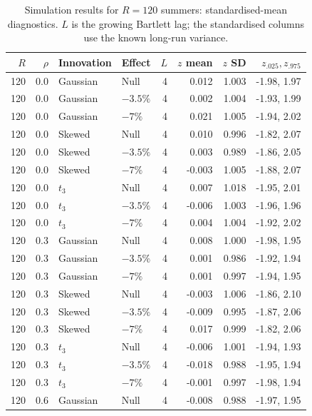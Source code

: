 \begin{table}[H]
\centering
\normalsize\renewcommand{\arraystretch}{1.55}\setlength{\tabcolsep}{4pt}
\caption{Simulation results for $R=120$ summers: standardised-mean diagnostics. $L$ is the growing Bartlett lag; the standardised columns use the known long-run variance.}
\label{tab:year-simulation-complete-b-r120}
\begin{tabular*}{\textwidth}{@{\extracolsep{\fill}}rrllrrrr}
\toprule
$R$ & $\rho$ & Innovation & Effect & $L$ & $z$ mean & $z$ SD & $z_{.025},z_{.975}$ \\
\midrule
120 & 0.0 & Gaussian & Null & 4 & 0.012 & 1.003 & -1.98, 1.97 \\
120 & 0.0 & Gaussian & $-3.5\%$ & 4 & 0.002 & 1.004 & -1.93, 1.99 \\
120 & 0.0 & Gaussian & $-7\%$ & 4 & 0.021 & 1.005 & -1.94, 2.02 \\
120 & 0.0 & Skewed & Null & 4 & 0.010 & 0.996 & -1.82, 2.07 \\
120 & 0.0 & Skewed & $-3.5\%$ & 4 & 0.003 & 0.989 & -1.86, 2.05 \\
120 & 0.0 & Skewed & $-7\%$ & 4 & -0.003 & 1.005 & -1.88, 2.07 \\
120 & 0.0 & $t_3$ & Null & 4 & 0.007 & 1.018 & -1.95, 2.01 \\
120 & 0.0 & $t_3$ & $-3.5\%$ & 4 & -0.006 & 1.003 & -1.96, 1.96 \\
120 & 0.0 & $t_3$ & $-7\%$ & 4 & 0.004 & 1.004 & -1.92, 2.02 \\
120 & 0.3 & Gaussian & Null & 4 & 0.008 & 1.000 & -1.98, 1.95 \\
120 & 0.3 & Gaussian & $-3.5\%$ & 4 & 0.001 & 0.986 & -1.92, 1.94 \\
120 & 0.3 & Gaussian & $-7\%$ & 4 & 0.001 & 0.997 & -1.94, 1.95 \\
120 & 0.3 & Skewed & Null & 4 & -0.003 & 1.006 & -1.86, 2.10 \\
120 & 0.3 & Skewed & $-3.5\%$ & 4 & -0.009 & 0.995 & -1.87, 2.06 \\
120 & 0.3 & Skewed & $-7\%$ & 4 & 0.017 & 0.999 & -1.82, 2.06 \\
120 & 0.3 & $t_3$ & Null & 4 & -0.006 & 1.001 & -1.94, 1.93 \\
120 & 0.3 & $t_3$ & $-3.5\%$ & 4 & -0.018 & 0.988 & -1.95, 1.94 \\
120 & 0.3 & $t_3$ & $-7\%$ & 4 & -0.001 & 0.997 & -1.98, 1.94 \\
120 & 0.6 & Gaussian & Null & 4 & -0.008 & 0.988 & -1.97, 1.95 \\

\end{tabular*}
\end{table}
